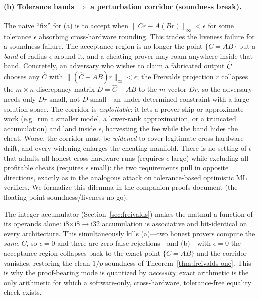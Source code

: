 \paragraph{(b) Tolerance bands $\Rightarrow$ a perturbation corridor (soundness break).}
The naive ``fix'' for (a) is to accept when $\lVert C r - A(Br)\rVert_\infty < \epsilon$
for some tolerance $\epsilon$ absorbing cross-hardware rounding. This trades the
liveness failure for a soundness failure. The acceptance region is no longer the point
$\{C = AB\}$ but a \emph{band} of radius $\epsilon$ around it, and a cheating prover may
roam anywhere inside that band. Concretely, an adversary who wishes to claim a
fabricated output $\hat C$ chooses any $\hat C$ with $\lVert (\hat C - AB) r \rVert_\infty
< \epsilon$; the Freivalds projection $r$ collapses the $m\times n$ discrepancy matrix
$D = \hat C - AB$ to the $m$-vector $Dr$, so the adversary needs only $Dr$ small, not
$D$ small---an under-determined constraint with a large solution space. The corridor is
\emph{exploitable}: it lets a prover skip or approximate work (e.g.\ run a smaller
model, a lower-rank approximation, or a truncated accumulation) and land inside
$\epsilon$, harvesting the fee while the band hides the cheat. Worse, the corridor must
be \emph{widened} to cover legitimate cross-hardware drift, and every widening enlarges
the cheating manifold. There is no setting of $\epsilon$ that admits all honest
cross-hardware runs (requires $\epsilon$ large) while excluding all profitable cheats
(requires $\epsilon$ small): the two requirements pull in opposite directions, exactly
as in the analogous attack on tolerance-based optimistic ML verifiers. We formalize
this dilemma in the companion proofs document (the floating-point soundness/liveness
no-go).

\begin{remark}
The integer accumulator (Section~\ref{sec:freivalds}) makes the matmul a function of
its operands alone: i8$\times$i8$\to$i32 accumulation is associative and bit-identical
on every architecture. This simultaneously kills (a)---two honest provers compute the
\emph{same} $C$, so $\epsilon = 0$ and there are zero false rejections---and (b)---with
$\epsilon = 0$ the acceptance region collapses back to the exact point $\{C = AB\}$ and
the corridor vanishes, restoring the clean $1/p$ soundness of
Theorem~\ref{thm:freivalds-one}. This is why the proof-bearing mode is quantized by
\emph{necessity}: exact arithmetic is the only arithmetic for which a software-only,
cross-hardware, tolerance-free equality check exists.
\end{remark}

